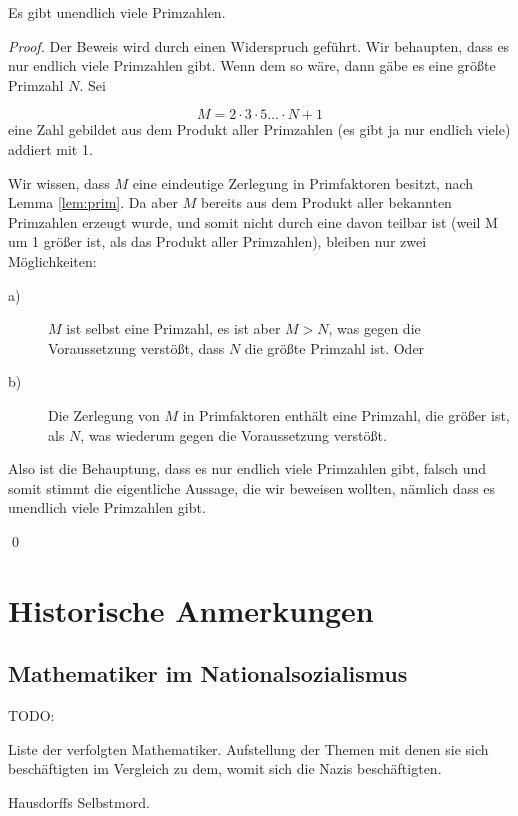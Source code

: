 \begin{theorem}
Es gibt unendlich viele Primzahlen.
\end{theorem}
\begin{proof}
Der Beweis wird durch einen Widerspruch geführt. Wir behaupten, dass es nur endlich viele Primzahlen gibt. Wenn dem so wäre, dann gäbe es eine größte Primzahl $N$. Sei

\[ M = 2\cdot 3\cdot 5\dots \cdot N +1 \]
eine Zahl gebildet aus dem Produkt aller Primzahlen (es gibt ja nur endlich viele) addiert mit 1.

Wir wissen, dass $M$ eine eindeutige Zerlegung in Primfaktoren besitzt, nach Lemma \ref{lem:prim}. Da aber $M$ bereits aus dem Produkt aller bekannten Primzahlen erzeugt wurde, und somit nicht durch eine davon teilbar ist (weil M um 1 größer ist, als das Produkt aller Primzahlen), bleiben nur zwei Möglichkeiten: 

\begin{description}
\item[a)] $M$ ist selbst eine Primzahl, es ist aber $M>N$, was gegen die Voraussetzung verstößt, dass $N$ die größte Primzahl ist. Oder
\item[b)] Die Zerlegung von $M$ in Primfaktoren enthält eine Primzahl, die größer ist, als $N$, was wiederum gegen die Voraussetzung verstößt.
\end{description}

Also ist die Behauptung, dass es nur endlich viele Primzahlen gibt, falsch und somit stimmt die eigentliche Aussage, die wir beweisen wollten, nämlich dass es unendlich viele Primzahlen gibt. 

\qed
\end{proof}


\section{Historische Anmerkungen}

\subsection{Mathematiker im Nationalsozialismus}

TODO:

Liste der verfolgten Mathematiker. Aufstellung der Themen mit denen sie sich beschäftigten im Vergleich zu dem, womit sich die Nazis beschäftigten.

Hausdorffs Selbstmord.